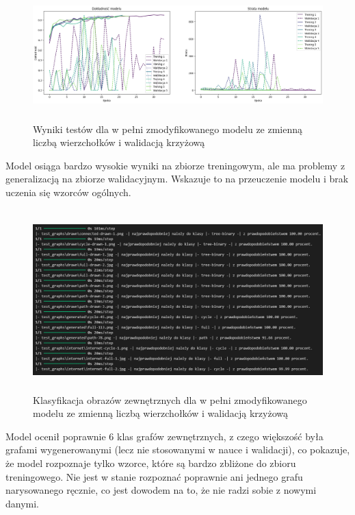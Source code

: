 \begin{figure}[ht]
	\centering
	\includegraphics[height=5cm]{resources/tests/images/v4/multiple_edges_crossvalid_img.png}
	\caption{Wyniki testów dla w pełni zmodyfikowanego modelu ze zmienną liczbą wierzchołków i walidacją krzyżową}
	\label{Fig:tests-var-2}
\end{figure}
\FloatBarrier

Model osiąga bardzo wysokie wyniki na zbiorze treningowym,
ale ma problemy z generalizacją na zbiorze walidacyjnym.
Wskazuje to na przeuczenie modelu i brak uczenia się wzorców ogólnych.

\begin{figure}[ht]
	\centering
	\includegraphics[height=7cm]{resources/tests/images/v4/multiple_edges_crossvalid_txt.png}
	\caption{Klasyfikacja obrazów zewnętrznych dla w pełni zmodyfikowanego modelu ze zmienną liczbą wierzchołków i walidacją krzyżową}
	\label{Fig:tests-var-2}
\end{figure}
\FloatBarrier

Model ocenił poprawnie 6 klas grafów zewnętrznych, z czego większość była grafami wygenerowanymi
(lecz nie stosowanymi w nauce i walidacji), co pokazuje, że model rozpoznaje tylko wzorce,
które są bardzo zbliżone do zbioru treningowego.
Nie jest w stanie rozpoznać poprawnie ani jednego grafu narysowanego ręcznie,
co jest dowodem na to, że nie radzi sobie z nowymi danymi.